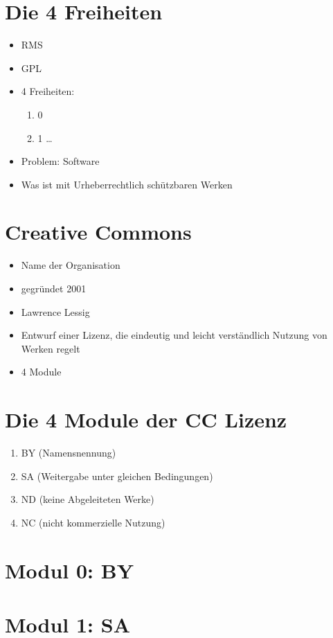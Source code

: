 \documentclass[14pt,handout]{beamer}
\begin{document}
\section{Die 4 Freiheiten}
\begin{itemize}
    \item<2-> RMS
    \item<3-> GPL
    \item<4-> 4 Freiheiten:
        \begin{enumerate}\setcounter{enumi}{0}
            \item<2-> 0
            \item<2-> 1 \ldots
        \end{enumerate}
    \item<5-> Problem: Software
    \item<6-> Was ist mit Urheberrechtlich schützbaren Werken
\end{itemize}
\section{Creative Commons}
\begin{itemize}
    \item<2-> Name der Organisation
    \item<3-> gegründet 2001
    \item<4-> Lawrence Lessig
    \item<5-> Entwurf einer Lizenz, die eindeutig und leicht verständlich Nutzung von Werken regelt
    \item<6-> 4 Module
\end{itemize}
\section{Die 4 Module der CC Lizenz}
\begin{enumerate}
    \item<2-> BY (Namensnennung)
    \item<3-> SA (Weitergabe unter gleichen Bedingungen)
    \item<4-> ND (keine Abgeleiteten Werke)
    \item<5-> NC (nicht kommerzielle Nutzung)
\end{enumerate}
\section{Modul 0: BY}
\section{Modul 1: SA}
\end{document}
